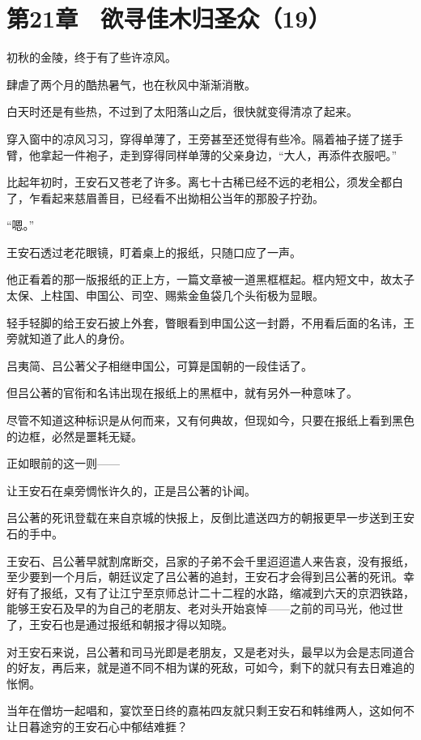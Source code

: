 \section{第21章　欲寻佳木归圣众（19）}

初秋的金陵，终于有了些许凉风。

肆虐了两个月的酷热暑气，也在秋风中渐渐消散。

白天时还是有些热，不过到了太阳落山之后，很快就变得清凉了起来。

穿入窗中的凉风习习，穿得单薄了，王旁甚至还觉得有些冷。隔着袖子搓了搓手臂，他拿起一件袍子，走到穿得同样单薄的父亲身边，“大人，再添件衣服吧。”

比起年初时，王安石又苍老了许多。离七十古稀已经不远的老相公，须发全都白了，乍看起来慈眉善目，已经看不出拗相公当年的那股子拧劲。

“嗯。”

王安石透过老花眼镜，盯着桌上的报纸，只随口应了一声。

他正看着的那一版报纸的正上方，一篇文章被一道黑框框起。框内短文中，故太子太保、上柱国、申国公、司空、赐紫金鱼袋几个头衔极为显眼。

轻手轻脚的给王安石披上外套，瞥眼看到申国公这一封爵，不用看后面的名讳，王旁就知道了此人的身份。

吕夷简、吕公著父子相继申国公，可算是国朝的一段佳话了。

但吕公著的官衔和名讳出现在报纸上的黑框中，就有另外一种意味了。

尽管不知道这种标识是从何而来，又有何典故，但现如今，只要在报纸上看到黑色的边框，必然是噩耗无疑。

正如眼前的这一则——

让王安石在桌旁惆怅许久的，正是吕公著的讣闻。

吕公著的死讯登载在来自京城的快报上，反倒比遣送四方的朝报更早一步送到王安石的手中。

王安石、吕公著早就割席断交，吕家的子弟不会千里迢迢遣人来告哀，没有报纸，至少要到一个月后，朝廷议定了吕公著的追封，王安石才会得到吕公著的死讯。幸好有了报纸，又有了让江宁至京师总计二十二程的水路，缩减到六天的京泗铁路，能够王安石及早的为自己的老朋友、老对头开始哀悼——之前的司马光，他过世了，王安石也是通过报纸和朝报才得以知晓。

对王安石来说，吕公著和司马光即是老朋友，又是老对头，最早以为会是志同道合的好友，再后来，就是道不同不相为谋的死敌，可如今，剩下的就只有去日难追的怅惘。

当年在僧坊一起唱和，宴饮至日终的嘉祐四友就只剩王安石和韩维两人，这如何不让日暮途穷的王安石心中郁结难捱？

